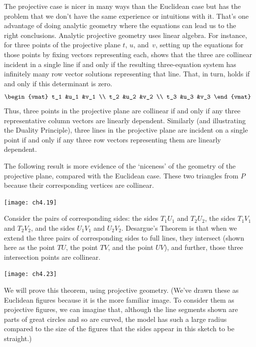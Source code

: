 The projective case is nicer in many ways than the Euclidean case but 
has the problem that we don't have the same experience or
intuitions with it.
That's one advantage of doing analytic geometry where the equations can 
lead us to the right conclusions.
Analytic projective geometry uses linear algebra.
For instance, for three points of the projective plane
$t$, $u$, and~$v$, 
setting up the equations for those points by fixing vectors representing each,
shows that the three are collinear \Dash  incident 
in a single line \Dash  if and only if the resulting three-equation
system has infinitely many row vector solutions
representing that line.
That, in turn, holds if and only if this determinant is zero.
\begin{equation*}
  \begin{vmat}
    t_1  &u_1  &v_1  \\
    t_2  &u_2  &v_2  \\
    t_3  &u_3  &v_3  
  \end{vmat}
\end{equation*}
Thus, three points in the projective plane are collinear if and only if
any three representative column vectors are linearly dependent.
Similarly (and illustrating the Duality Principle), 
three lines in the projective plane are incident on a single
point if and only if any three row vectors representing them are linearly
dependent.

The following result is more evidence of the `niceness' 
of the geometry of the projective plane, compared with the Euclidean case.
These two triangles 
 from $P$ 
because their corresponding vertices are collinear.
\begin{center}
  \texttt{[image: ch4.19]}
\end{center}
Consider the pairs of corresponding sides:
the sides $T_1U_1$ and $T_2U_2$, 
the sides $T_1V_1$ and $T_2V_2$, 
and the sides $U_1V_1$ and $U_2V_2$.
Desargue's Theorem 
is that when we extend the three pairs of corresponding 
sides to full lines, they intersect
(shown here as the point $TU$, the point $TV$, and the point $UV$),
and further, those three intersection points are collinear.
\begin{center}
  \texttt{[image: ch4.23]}
\end{center}
We will prove this theorem, using projective geometry.
(We've drawn these as Euclidean figures because it is the more familiar image.
To consider them as projective figures,
we can imagine that, although the line segments shown are parts of great 
circles and so are curved,
the model has such a large radius compared to the size of the 
figures that the sides appear in this sketch to be straight.)

